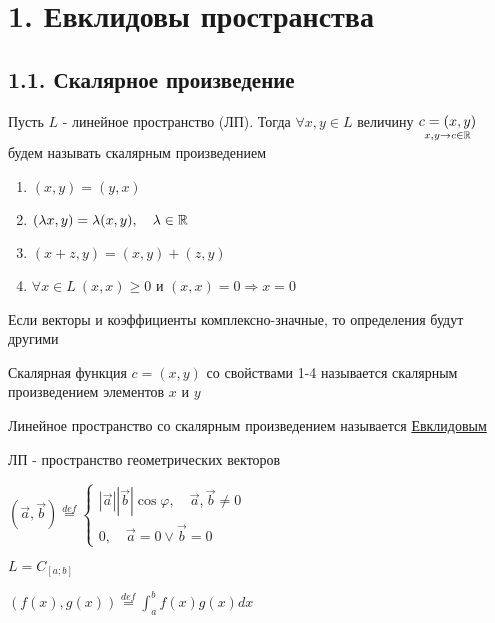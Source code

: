 \documentclass[12pt]{article}
\begin{document}
    \tableofcontents
    \clearpage


    \section{1. Евклидовы пространства}

    \subsection{1.1. Скалярное произведение}

    Пусть $L$ - линейное пространство (ЛП). Тогда $\forall x, y \in L$ величину $\underset{x, y \to c \in \mathbb{R}}{c = (x, y)}$
    будем называть скалярным произведением


    \hypertarget{scalarproductdefinition}{}

    \begin{enumerate}
        \item $(x, y) = (y, x)$
        \item $(\lambda x, y) = \lambda (x, y), \quad \lambda \in \mathbb{R}$
        \item $(x + z, y) = (x, y) + (z, y)$
        \item $\forall x \in L\ (x, x) \geq 0$ и $(x, x) = 0 \Longrightarrow x = 0$
    \end{enumerate}

    \Notas Если векторы и коэффициенты комплексно-значные, то определения будут другими

    \Def Скалярная функция $c = (x, y)$ со свойствами 1-4 называется скалярным произведением элементов $x$ и $y$

    \hypertarget{euclidspacedefinition}{}

    \Def Линейное пространство со скалярным произведением называется \underline{Евклидовым}

     ЛП - пространство геометрических векторов

    $(\vec{a}, \vec{b}) \stackrel{def}{=}
    \begin{cases}
        |\vec{a}||\vec{b}|\cos\varphi, \quad \vec{a}, \vec{b} \neq 0 \\
        0, \quad \vec{a} = 0 \lor \vec{b} = 0
    \end{cases}$

     $L = C_{[a;b]}$

    $(f(x), g(x)) \stackrel{def}{=} \int^b_a f(x)g(x) dx$
\end{document}
